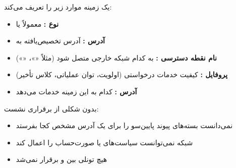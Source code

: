 یک زمینه  موارد زیر را تعریف می‌کند:

\begin{itemize}
\tightlist
\item
  \textbf{نوع :} معمولاً  یا 
\item
  \textbf{آدرس :} آدرس  تخصیص‌یافته به 
\item
  \textbf{نام نقطه دسترسی :} به کدام شبکه خارجی متصل شود (مثلاً «»، «»)
\item
  \textbf{پروفایل :} کیفیت خدمات درخواستی (اولویت، توان عملیاتی، کلاس تأخیر)
\item
  \textbf{آدرس :} کدام  به این زمینه خدمات می‌دهد
\end{itemize}


بدون شکلی از برقراری نشست:

\begin{itemize}
\tightlist
\item
   نمی‌دانست بسته‌های پیوند پایین‌سو را برای یک آدرس  مشخص کجا بفرستد
\item
  شبکه نمی‌توانست سیاست‌های  یا صورت‌حساب را اعمال کند
\item
  هیچ تونلی بین  و  برقرار نمی‌شد
\end{itemize}






